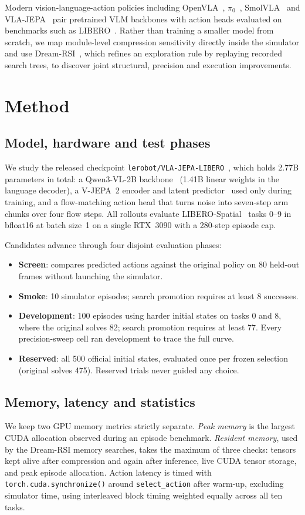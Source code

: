 \documentclass[conference]{IEEEtran}
\begin{document}
Modern vision-language-action policies including OpenVLA~\cite{openvla}, $\pi_0$~\cite{pi0},
SmolVLA~\cite{smolvla} and VLA-JEPA~\cite{vlajepa} pair pretrained VLM backbones with action heads
evaluated on benchmarks such as LIBERO~\cite{libero}. Rather than training a smaller model from
scratch, we map module-level compression sensitivity directly inside the simulator and use
Dream-RSI~\cite{dreamrsi}, which refines an exploration rule by replaying recorded search trees, to
discover joint structural, precision and execution improvements.

\section{Method}
\label{sec:method}
\subsection{Model, hardware and test phases}
We study the released checkpoint \texttt{lerobot/VLA-JEPA-LIBERO}~\cite{lerobot}, which holds
2.77B parameters in total: a Qwen3-VL-2B backbone~\cite{qwen3vl} (1.41B linear weights in the
language decoder), a V-JEPA~2 encoder and latent predictor~\cite{vjepa2} used only during training,
and a flow-matching action head that turns noise into seven-step arm chunks over four flow steps.
All rollouts evaluate LIBERO-Spatial~\cite{libero} tasks 0--9 in bfloat16 at batch size~1 on a
single RTX~3090 with a 280-step episode cap.

Candidates advance through four disjoint evaluation phases:
\begin{itemize}
\item \textbf{Screen}: compares predicted actions against the original policy on 80 held-out frames
without launching the simulator.
\item \textbf{Smoke}: 10 simulator episodes; search promotion requires at least 8 successes.
\item \textbf{Development}: 100 episodes using harder initial states on tasks 0 and 8, where the
original solves 82; search promotion requires at least 77. Every precision-sweep cell ran development
to trace the full curve.
\item \textbf{Reserved}: all 500 official initial states, evaluated once per frozen selection
(original solves 475). Reserved trials never guided any choice.
\end{itemize}

\subsection{Memory, latency and statistics}
\label{sec:memory}
We keep two GPU memory metrics strictly separate. \emph{Peak memory} is the largest CUDA allocation
observed during an episode benchmark. \emph{Resident memory}, used by the Dream-RSI memory
searches, takes the maximum of three checks: tensors kept alive after compression and again after
inference, live CUDA tensor storage, and peak episode allocation. Action latency is timed with
\texttt{torch.cuda.synchronize()} around \texttt{select\_action} after warm-up, excluding simulator
time, using interleaved block timing weighted equally across all ten tasks.
\end{document}
